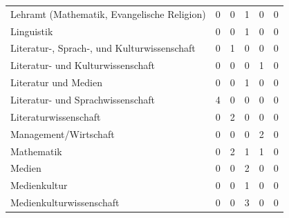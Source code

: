 \documentclass{scrartcl}
\begin{document}
\begin{landscape}
\begin{longtable}{L{7.5cm}ccccc}
Lehramt (Mathematik, Evangelische Religion)          & 0                     &  0                       &  1                       & 0                    & 0                       \\
Linguistik                                           & 0                     &  0                       &  1                       & 0                    & 0                       \\
Literatur-, Sprach-, und Kulturwissenschaft          & 0                     &  1                       &  0                       & 0                    & 0                       \\
Literatur- und Kulturwissenschaft                    & 0                     &  0                       &  0                       & 1                    & 0                       \\
Literatur und Medien                                 & 0                     &  0                       &  1                       & 0                    & 0                       \\
Literatur- und Sprachwissenschaft                    & 4                     &  0                       &  0                       & 0                    & 0                       \\
Literaturwissenschaft                                & 0                     &  2                       &  0                       & 0                    & 0                       \\
Management/Wirtschaft                                & 0                     &  0                       &  0                       & 2                    & 0                       \\
Mathematik                                           & 0                     &  2                       &  1                       & 1                    & 0                       \\
Medien                                               & 0                     &  0                       &  2                       & 0                    & 0                       \\
Medienkultur                                         & 0                     &  0                       &  1                       & 0                    & 0                       \\
Medienkulturwissenschaft                             & 0                     &  0                       &  3                       & 0                    & 0                       \\

\end{longtable}
\end{landscape}
\end{document}
